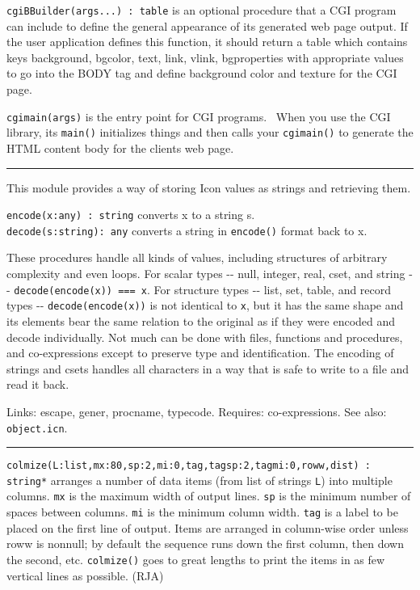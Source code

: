 \texttt{cgiBBuilder(args...) : table} is an optional procedure that a
CGI program can include to define the general appearance of its
generated web page output. If the user application defines this
function, it should return a table which contains keys
{\textquotedbl}background{\textquotedbl},
{\textquotedbl}bgcolor{\textquotedbl},
{\textquotedbl}text{\textquotedbl}, {\textquotedbl}link{\textquotedbl},
{\textquotedbl}vlink{\textquotedbl},
{\textquotedbl}bgproperties{\textquotedbl} with appropriate values to
go into the BODY tag and define background color and texture for the
CGI page. 

\texttt{cgimain(args)} is the entry point for CGI programs. \ When you
use the CGI library, its \texttt{main()} initializes things and then
calls your \texttt{cgimain()} to generate the HTML content body for the
client{\textquotesingle}s web page. 

\vspace{0.25cm}\hrule{}

This module provides a way of storing Icon values as strings and
retrieving them.

\texttt{encode(x:any) : string} converts x to a string s.\\
\texttt{decode(s:string): any} converts a string in \texttt{encode()}
format back to x.

These procedures handle all kinds of values, including structures of
arbitrary complexity and even loops. For scalar types -{}- null,
integer, real, cset, and string -{}- \texttt{decode(encode(x)) === x}.
For structure types -{}- list, set, table, and record types -{}-
\texttt{decode(encode(x))} is not identical to \texttt{x}, but it has
the same {\textquotedbl}shape{\textquotedbl} and its elements bear the
same relation to the original as if they were encoded and decode
individually. Not much can be done with files, functions and
procedures, and co-expressions except to preserve type and
identification. The encoding of strings and csets handles all
characters in a way that is safe to write to a file and read it back.

Links: \textsf{escape}, \textsf{gener}, \textsf{procname},
\textsf{typecode}. Requires: co-expressions. See also:
\texttt{object.icn}. 

\vspace{0.25cm}\hrule{}

\texttt{colmize(L:list,mx:80,sp:2,mi:0,tag,tagsp:2,tagmi:0,roww,dist) :
string*} arranges a number of data items (from list of strings
\texttt{L}) into multiple columns. \texttt{mx} is the maximum width of
output lines. \texttt{sp} is the minimum number of spaces between
columns. \texttt{mi} is the minimum column width. \texttt{tag} is a
label to be placed on the first line of output. Items are arranged in
column-wise order unless roww is nonnull; by default the sequence runs
down the first column, then down the second, etc. \texttt{colmize()}
goes to great lengths to print the items in as few vertical lines as
possible. (RJA)

